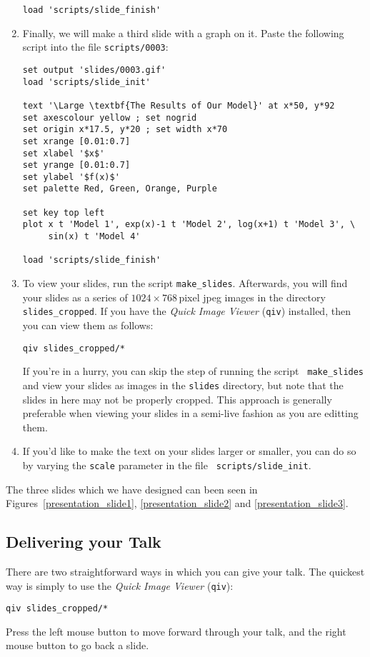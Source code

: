 \begin{enumerate}
\begin{verbatim}
load 'scripts/slide_finish'
\end{verbatim}
\item Finally, we will make a third slide with a graph on it. Paste the
following script into the file {\tt scripts/0003}:
\begin{verbatim}
set output 'slides/0003.gif'
load 'scripts/slide_init'

text '\Large \textbf{The Results of Our Model}' at x*50, y*92
set axescolour yellow ; set nogrid
set origin x*17.5, y*20 ; set width x*70
set xrange [0.01:0.7]
set xlabel '$x$'
set yrange [0.01:0.7]
set ylabel '$f(x)$'
set palette Red, Green, Orange, Purple

set key top left
plot x t 'Model 1', exp(x)-1 t 'Model 2', log(x+1) t 'Model 3', \
     sin(x) t 'Model 4'

load 'scripts/slide_finish'
\end{verbatim}
\item To view your slides, run the script {\tt make\_slides}. Afterwards, you
will find your slides as a series of $1024\times768$\,pixel jpeg images in the
directory {\tt slides\_cropped}.  If you have the {\it Quick Image
Viewer}\index{Quick Image Viewer} ({\tt qiv}) installed, then you can view them
as follows:
\begin{verbatim}
qiv slides_cropped/*
\end{verbatim}
If you're in a hurry, you can skip the step of running the script {\tt
make\_slides} and view your slides as images in the {\tt slides} directory, but
note that the slides in here may not be properly cropped. This approach is
generally preferable when viewing your slides in a semi-live fashion as you are
editting them.
\item If you'd like to make the text on your slides larger or smaller, you can
do so by varying the {\tt scale} parameter in the file {\tt
scripts/slide\_init}.
\end{enumerate}

The three slides which we have designed can been seen in
Figures~\ref{presentation_slide1}, \ref{presentation_slide2} and
\ref{presentation_slide3}.

\subsection{Delivering your Talk}

There are two straightforward ways in which you can give your talk. The
quickest way is simply to use the {\it Quick Image Viewer}\index{Quick Image
Viewer} ({\tt qiv}):
\begin{verbatim}
qiv slides_cropped/*
\end{verbatim}
Press the left mouse button to move forward through your talk, and the right
mouse button to go back a slide.


